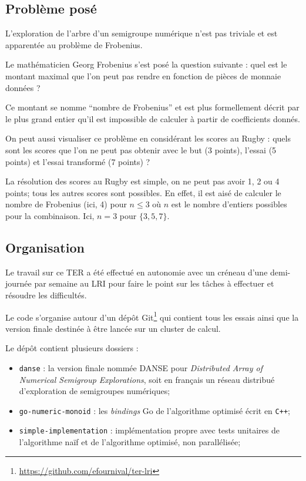 \documentclass[12pt,a4paper]{article}
\let\leq\leqslant
\begin{document}
\subsection*{Problème posé}
L'exploration de l'arbre d'un semigroupe numérique n'est pas triviale et est apparentée au problème de Frobenius.

Le mathématicien Georg Frobenius s'est posé la question suivante : quel est le montant maximal que l'on peut pas rendre en fonction de pièces de monnaie données ?

Ce montant se nomme ``nombre de Frobenius'' et est plus formellement décrit par le plus grand entier qu'il est impossible de calculer à partir de coefficients donnés.

On peut aussi visualiser ce problème en considérant les scores au Rugby : quels sont les scores que l'on ne peut pas obtenir avec le but (3 points), l'essai (5 points) et l'essai transformé (7 points) ?

La résolution des scores au Rugby est simple, on ne peut pas avoir 1, 2 ou 4 points; tous les autres scores sont possibles. En effet, il est aisé de calculer le nombre de Frobenius (ici, 4) pour $n \leq 3$ où $n$ est le nombre d'entiers possibles pour la combinaison. Ici, $n = 3$ pour $\{3,5,7\}$.

\subsection*{Organisation}
Le travail sur ce TER a été effectué en autonomie avec un créneau d'une demi-journée par semaine au LRI pour faire le point sur les tâches à effectuer et résoudre les difficultés.

Le code s'organise autour d'un dépôt Git\footnote{\url{https://github.com/efournival/ter-lri}} qui contient tous les essais ainsi que la version finale destinée à être lancée sur un cluster de calcul.

Le dépôt contient plusieurs dossiers :
\begin{itemize}
	\item	\texttt{danse} : la version finale nommée DANSE pour \emph{Distributed Array of Numerical Semigroup Explorations}, soit en français un réseau distribué d'exploration de semigroupes numériques;
	\item	\texttt{go-numeric-monoid} : les \emph{bindings} Go de l'algorithme optimisé écrit en \texttt{C++};
	\item	\texttt{simple-implementation} : implémentation propre avec tests unitaires de l'algorithme naïf et de l'algorithme optimisé, non parallélisée;
\end{itemize}
\end{document}
